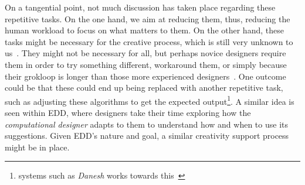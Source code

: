 
On a tangential point, not much discussion has taken place regarding these repetitive tasks. On the one hand, we aim at reducing them, thus, reducing the human workload to focus on what matters to them. On the other hand, these tasks might be necessary for the creative process, which is still very unknown to us~\cite{boden_creative_2004}. They might not be necessary for all, but perhaps novice designers require them in order to try something different, workaround them, or simply because their grokloop is longer than those more experienced designers~\cite{compton_casual_2015}. One outcome could be that these could end up being replaced with another repetitive task, such as adjusting these algorithms to get the expected output\footnote{systems such as \emph{Danesh} works towards this~\cite{cook_danesh_2016}}. A similar idea is seen within EDD, where designers take their time exploring how the \emph{computational designer} adapts to them to understand how and when to use its suggestions. Given EDD's nature and goal, a similar creativity support process might be in place.




